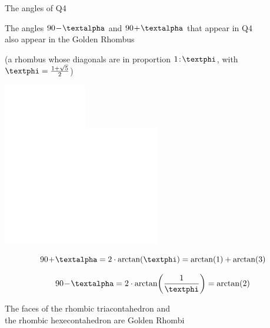 \documentclass[14pt]{beamer}
\begin{document}

    \begin{frame}{The angles of Q4}
        \begin{center}
            The angles $90\!-\!\text{\textalpha}$ and $90\!+\!\text{\textalpha}$ that appear in Q4\\also appear in the Golden Rhombus

            \medskip

            {\footnotesize(a rhombus whose diagonals are in proportion $1\!:\!\text{\textphi}$, with $\text{\textphi} =\tfrac{1+\sqrt{5}}{2}$)}

            \bigskip

            \begin{minipage}{16ex}\vspace{2ex}
                \includegraphics[height=15ex]{figures/figure007a.pdf}\includegraphics[height=15ex]{figures/figure007b.pdf}\\
            \end{minipage}\quad\begin{minipage}{25ex}
                \footnotesize
                $$90\!+\!\text{\textalpha} = 2\cdot\arctan{\!\left(\text{\textphi}\right)} = \arctan{\!\left(1\right)} + \arctan{\!\left(3\right)}$$

                $$90\!-\!\text{\textalpha} = 2\cdot\arctan{\!\left(\frac{1}{\text{\textphi}}\right)} = \arctan{\!\left(2\right)}$$

                \bigskip
            \end{minipage}

            {\footnotesize The faces of the rhombic triacontahedron and\\the rhombic hexecontahedron are Golden Rhombi}
        \end{center}
    \end{frame}
\end{document}
